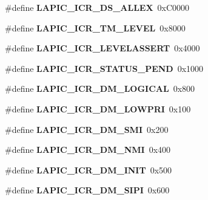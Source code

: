 \begin{DoxyCompactItemize}
\#define {\bfseries L\+A\+P\+I\+C\+\_\+\+I\+C\+R\+\_\+\+D\+S\+\_\+\+A\+L\+L\+EX}~0x\+C0000
\item 
\mbox{\label{group__i386__apci_gac1a617e437a730d5e38cfdd003ea9cf6}} 
\#define {\bfseries L\+A\+P\+I\+C\+\_\+\+I\+C\+R\+\_\+\+T\+M\+\_\+\+L\+E\+V\+EL}~0x8000
\item 
\mbox{\label{group__i386__apci_ga0068ce16a75acbc0ac089e843cfa6a12}} 
\#define {\bfseries L\+A\+P\+I\+C\+\_\+\+I\+C\+R\+\_\+\+L\+E\+V\+E\+L\+A\+S\+S\+E\+RT}~0x4000
\item 
\mbox{\label{group__i386__apci_gaf84949ec3c9c35c4c2b9ed62336cdeff}} 
\#define {\bfseries L\+A\+P\+I\+C\+\_\+\+I\+C\+R\+\_\+\+S\+T\+A\+T\+U\+S\+\_\+\+P\+E\+ND}~0x1000
\item 
\mbox{\label{group__i386__apci_ga24569fb41081f584dba0aa20f93875f4}} 
\#define {\bfseries L\+A\+P\+I\+C\+\_\+\+I\+C\+R\+\_\+\+D\+M\+\_\+\+L\+O\+G\+I\+C\+AL}~0x800
\item 
\mbox{\label{group__i386__apci_ga2d0205c4ca1b97539ec40becb66b6712}} 
\#define {\bfseries L\+A\+P\+I\+C\+\_\+\+I\+C\+R\+\_\+\+D\+M\+\_\+\+L\+O\+W\+P\+RI}~0x100
\item 
\mbox{\label{group__i386__apci_ga26258bd700d3c3e6467b417566b6ed02}} 
\#define {\bfseries L\+A\+P\+I\+C\+\_\+\+I\+C\+R\+\_\+\+D\+M\+\_\+\+S\+MI}~0x200
\item 
\mbox{\label{group__i386__apci_ga31bd0feda759acceb848ade1c089351e}} 
\#define {\bfseries L\+A\+P\+I\+C\+\_\+\+I\+C\+R\+\_\+\+D\+M\+\_\+\+N\+MI}~0x400
\item 
\mbox{\label{group__i386__apci_gabe0d1814a53ee3706bd3625cfb0f0d24}} 
\#define {\bfseries L\+A\+P\+I\+C\+\_\+\+I\+C\+R\+\_\+\+D\+M\+\_\+\+I\+N\+IT}~0x500
\item 
\mbox{\label{group__i386__apci_ga96b59e817b80b08416835ddaeb22b55d}} 
\#define {\bfseries L\+A\+P\+I\+C\+\_\+\+I\+C\+R\+\_\+\+D\+M\+\_\+\+S\+I\+PI}~0x600
\item 
\mbox{\label{group__i386__apci_gab8554d966809d5c6db189a795ffae7c7}} 

\end{DoxyCompactItemize}
